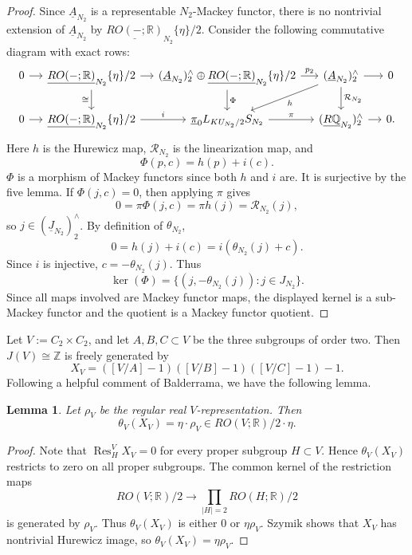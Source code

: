 \documentclass{amsart}
\theoremstyle{plain}
\newtheorem{lemma}[theorem]{Lemma}
\theoremstyle{definition}
\theoremstyle{remark}
\begin{document}
\begin{proof}
    Since $\underline{A}_{N_2}$ is a representable $N_2$-Mackey functor, there is no nontrivial extension of $\underline{A}_{N_2}$ by $\underline{RO(-;\mathbb{R})}_{N_2}\{\eta\}/2$. Consider the following commutative diagram with exact rows:
\[
\begin{tikzcd}[column sep=small]
0 \arrow[r] & \underline{RO(-;\mathbb{R})}_{N_2}\{\eta\}/2 \arrow[r] \arrow[d, "\cong"'] 
&
(\underline{A}_{N_2})_2^\wedge\oplus \underline{RO(-;\mathbb{R})}_{N_2}\{\eta\}/2
\arrow[r,"p_2"] \arrow[d, "\Phi"]
& (\underline{A}_{N_2})_2^\wedge \arrow[r] \arrow[d, "\mathcal{R}_{N_2}"] \arrow[ld,"h"] & 0 
\\
0 \arrow[r] & \underline{RO(-;\mathbb{R})}_{N_2}\{\eta\}/2 \arrow[r,"i"]
&
\underline{\pi}_0 L_{KU_{N_2}/2}S_{N_2}
\arrow[r,"\pi"]
&
(\underline{R\mathbb{Q}}_{N_2})_2^\wedge
\arrow[r]
&
0 .
\end{tikzcd}
\]
Here $h$ is the Hurewicz map, $\mathcal{R}_{N_2}$ is the linearization map, and 
\[
  \Phi(p,c)=h(p)+i(c).
\]
$\Phi$ is a morphism of Mackey functors since both $h$ and $i$ are. It is surjective by the five lemma. If $\Phi(j,c)=0$, then applying $\pi$ gives
\[
  0=\pi\Phi(j,c)=\pi h(j)=\mathcal{R}_{N_2}(j),
\]
so $j\in (\underline{J}_{N_2})_2^\wedge$. By definition of $\theta_{N_2}$,
\[
  0=h(j)+i(c)=i(\theta_{N_2}(j)+c).
\]
Since $i$ is injective, $c=-\theta_{N_2}(j)$.  Thus
\[
  \ker(\Phi)=\{(j,-\theta_{N_2}(j)):j\in J_{N_2}\}.
\]
Since all maps involved are Mackey functor maps, the displayed kernel is a sub-Mackey functor and the quotient is a Mackey functor quotient.
\end{proof}

Let $V:=C_2\times C_2$, and let $A,B,C\subset V$ be the three subgroups of order two. Then $J(V)\cong \mathbb{Z}$ is freely generated by
\[
  X_V=([V/A]-1)([V/B]-1)([V/C]-1)-1.
\]
Following a helpful comment of Balderrama, we have the following lemma. 
\begin{lemma}\label{lem:case N_2=V}
   Let $\rho_V$ be the regular real $V$-representation.  Then
    \[
    \theta_V(X_V)=\eta\cdot \rho_{V} \in RO(V;\mathbb R)/2\cdot \eta.
    \]
\end{lemma}
\begin{proof}
Note that $\operatorname{Res}^V_H X_V=0$ for every proper subgroup $H \subset V$. Hence
$\theta_V(X_V)$ restricts to zero on all proper subgroups. The common kernel of the restriction maps
\[
  RO(V;\mathbb R)/2\longrightarrow \prod_{|H|=2} RO(H;\mathbb R)/2
\]
is generated by $\rho_V$. Thus $\theta_V(X_V)$ is either $0$ or $\eta\rho_{V}$. Szymik \cite[Example 5.1]{szymik2013chromatic} shows that $X_V$ has nontrivial Hurewicz image, so $\theta_V(X_V)=\eta\rho_V$.
\end{proof}
\end{document}
